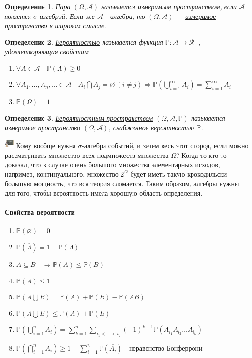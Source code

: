 \documentclass[12pt]{article}
\newtheorem{Def}{Определение}
\newenvironment{Wtf}{\includegraphics[height=5mm]{ping}}{}
\numberwithin{Th}{section}
\numberwithin{Def}{section}
\numberwithin{Lem}{section}
\numberwithin{St}{section}
\numberwithin{equation}{section}
\newcommand\Pro{\mathbb{P}}
\newcommand\Ev{\mathscr{A}}
\begin{document}
\begin{Def}
Пара $(\Omega, \Ev)$ называется \underline{измеримым пространством}, если $\Ev$ является $\sigma$-алгеброй. Если же $\Ev$ - алгебра, то  $(\Omega, \Ev)$ --- \underline{измеримое пространство} \underline{ в широком смысле}.
\end{Def}

\begin{Def}
\underline{Вероятностью} называется функция $\Pro \colon \Ev\rightarrow \mathscr{R}_+$, удовлетворяющая свойстам
\begin{enumerate}
	\item $\forall A \in \Ev \quad \Pro (A) \ge 0$
	\item $\forall A_1, \dots, A_n, \ldots \in \Ev \quad A_i \bigcap A_j  = \varnothing\  (i \not= j)  \Rightarrow \Pro (\bigcup\limits_{i=1}^{\infty} A_i) = \sum\limits_{i = 1}^{\infty} A_i$
	\item $\Pro (\Omega) = 1$
\end{enumerate}
\end{Def}

\begin{Def}
\underline{Вероятностным пространством} $(\Omega, \Ev, \Pro)$ называется измеримое пространство $(\Omega, \Ev)$, снабженное вероятностью $\Pro$.
\end{Def}
\begin{Wtf}
Кому вообще нужна $\sigma$-алгебра событий, и зачем весь этот огород, если можно рассматривать множество всех подмножеств множества $\Omega$? Когда-то кто-то доказал, что в случае очень большого множества элементарных исходов, например, континуального, множество $2^{\Omega}$ будет иметь такую крокодильски большую мощность, что вся теория сломается. Таким образом, алгебры нужны для того, чтобы вероятность имела хорошую область определения.
\end{Wtf}

\paragraph{Свойства вероятности}
\begin{enumerate}
	\item $\Pro (\varnothing) = 0$ 
	\item $\Pro (\overline{A}) = 1 - \Pro (A)$
	\item $A \subseteq B \quad \Rightarrow \Pro (A) \le \Pro (B)$
	\item $\Pro (A) \le 1$
	\item $\Pro (A \bigcup B) = \Pro (A) + \Pro (B) - \Pro (AB)$ 
	\item $\Pro (A \bigcup B) \le \Pro (A) + \Pro (B)$ 
	\item $\Pro (\bigcup\limits_{i=1}^{n} A_i) = \sum\limits_{k=1}^{n} \sum\limits_{i_1<\dots <i_k} (-1)^{k+1} \Pro(A_{i_1}A_{i_2}\ldots A_{i_k})$
	\item $\Pro (\bigcap\limits_{i=1}^{n} A_i) \ge 1 - \sum\limits_{i=1}^{n} \Pro (\overline{A_i})$ - неравенство Бонферрони
\end{enumerate}
\end{document}
